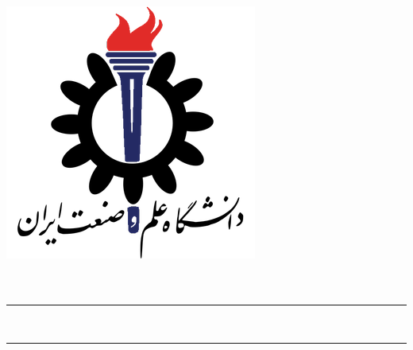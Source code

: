\begin{titlepage}
    \centering
    \includegraphics[scale = 0.5]{Images/IUSTLogo.png}\\
    \Huge{\Faculty}\\[0.2 cm]
    \huge{\Course}\\[0.2 cm]

    \rule{\linewidth}{1.0 mm}
    \huge{\Subject}\\[0.2 cm]
    \LARGE{\Title}
    \rule{\linewidth}{1.0 mm}\\[1.0 cm]
    
    \begin{minipage}{0.95 \textwidth}
        \centering
	    \Name
	\end{minipage}

\end{titlepage}